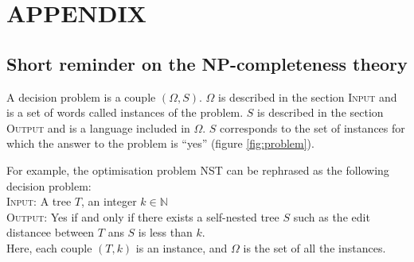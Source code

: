 \section*{APPENDIX}
\subsection*{Short reminder on the NP-completeness theory}
A decision problem is a couple $(\Omega, S)$. $\Omega$ is described in
the section \textsc{Input} and is a set of words called instances of
the problem. $S$ is described in the section \textsc{Output} and is a
language included in $\Omega$. $S$ corresponds to the set of instances
for which the answer to the problem is ``yes'' (figure \ref{fig:problem}).

For example, the optimisation problem NST can be rephrased as the
following decision problem:\\
\textsc{Input:} A tree $T$, an integer $k \in \mathbb{N}$\\
\textsc{Output:} Yes if and only if there exists a self-nested tree $S$
such as the edit distancee between $T$ ans $S$ is less than $k$.\\
Here, each couple $(T,k)$ is an instance, and $\Omega$ is the set of all
the instances.
 
